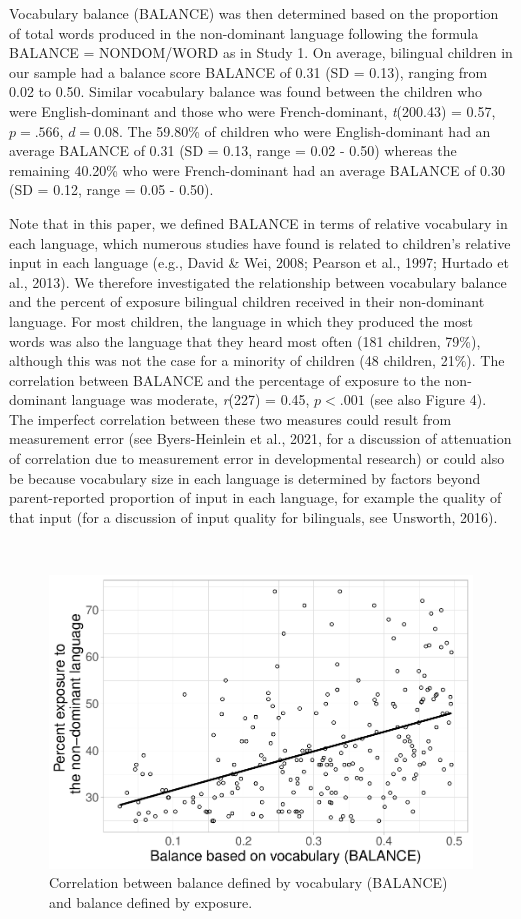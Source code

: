 \documentclass[
  english,
  ,man,floatsintext]{apa6}
\begin{document}
Vocabulary balance (BALANCE) was then determined based on the proportion of total words produced in the non-dominant language following the formula BALANCE = NONDOM/WORD as in Study 1. On average, bilingual children in our sample had a balance score BALANCE of 0.31 (SD = 0.13), ranging from 0.02 to 0.50. Similar vocabulary balance was found between the children who were English-dominant and those who were French-dominant, \emph{t}(200.43) = 0.57, \(p = .566\), \(d = 0.08\). The 59.80\% of children who were English-dominant had an average BALANCE of 0.31 (SD = 0.13, range = 0.02 - 0.50) whereas the remaining 40.20\% who were French-dominant had an average BALANCE of 0.30 (SD = 0.12, range = 0.05 - 0.50).

Note that in this paper, we defined BALANCE in terms of relative vocabulary in each language, which numerous studies have found is related to children's relative input in each language (e.g., David \& Wei, 2008; Pearson et al., 1997; Hurtado et al., 2013). We therefore investigated the relationship between vocabulary balance and the percent of exposure bilingual children received in their non-dominant language. For most children, the language in which they produced the most words was also the language that they heard most often (181 children, 79\%), although this was not the case for a minority of children (48 children, 21\%). The correlation between BALANCE and the percentage of exposure to the non-dominant language was moderate, \emph{r}(227) = 0.45, \(p < .001\) (see also Figure 4). The imperfect correlation between these two measures could result from measurement error (see Byers-Heinlein et al., 2021, for a discussion of attenuation of correlation due to measurement error in developmental research) or could also be because vocabulary size in each language is determined by factors beyond parent-reported proportion of input in each language, for example the quality of that input (for a discussion of input quality for bilinguals, see Unsworth, 2016).

~

\begin{figure}[H]

{\centering \includegraphics[width=0.75\linewidth]{paper_TE_bilingual_vocabulary_model_files/figure-latex/fig4-1} 

}

\caption{Correlation between balance defined by vocabulary (BALANCE) and balance defined by exposure.}\label{fig:fig4}
\end{figure}
\end{document}
